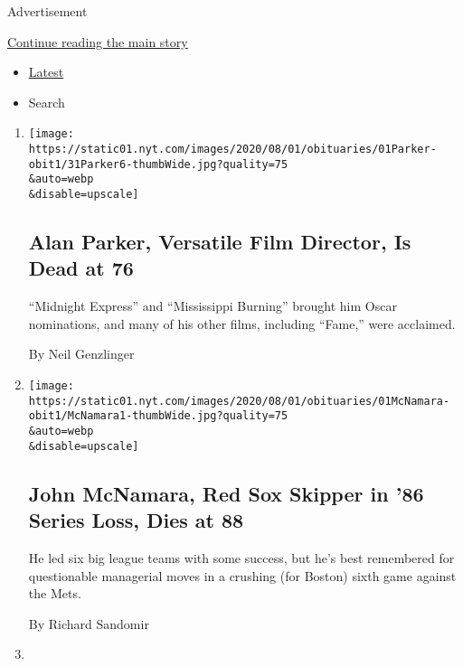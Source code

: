 Advertisement

\protect\hyperlink{after-mid2}{Continue reading the main story}

\begin{itemize}
\tightlist
\item
  \protect\hyperlink{stream-panel}{Latest}
\item
  Search
\end{itemize}

\begin{enumerate}
\def\labelenumi{\arabic{enumi}.}
\item
  \href{/2020/07/31/movies/alan-parker-versatile-film-director-is-dead-at-76.html}{}

  \texttt{[image: https://static01.nyt.com/images/2020/08/01/obituaries/01Parker-obit1/31Parker6-thumbWide.jpg?quality=75\\\&auto=webp\\\&disable=upscale]}

  \hypertarget{alan-parker-versatile-film-director-is-dead-at-76}{%
  \subsection{Alan Parker, Versatile Film Director, Is Dead at
  76}\label{alan-parker-versatile-film-director-is-dead-at-76}}

  ``Midnight Express'' and ``Mississippi Burning'' brought him Oscar
  nominations, and many of his other films, including ``Fame,'' were
  acclaimed.

  By Neil Genzlinger
\item
  \href{/2020/07/31/sports/baseball/john-mcnamara-dead.html}{}

  \texttt{[image: https://static01.nyt.com/images/2020/08/01/obituaries/01McNamara-obit1/McNamara1-thumbWide.jpg?quality=75\\\&auto=webp\\\&disable=upscale]}

  \hypertarget{john-mcnamara-red-sox-skipper-in-86-series-loss-dies-at-88}{%
  \subsection{John McNamara, Red Sox Skipper in '86 Series Loss, Dies at
  88}\label{john-mcnamara-red-sox-skipper-in-86-series-loss-dies-at-88}}

  He led six big league teams with some success, but he's best
  remembered for questionable managerial moves in a crushing (for
  Boston) sixth game against the Mets.

  By Richard Sandomir
\item
  \href{/interactive/2020/07/31/briefing/troops-baseball-louie-gohmert-news-quiz.html}{}


\end{enumerate}
